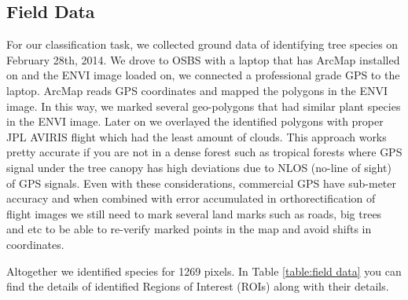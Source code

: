 \documentclass[remotesensing,article,accept,moreauthors,pdftex,12pt,a4paper]{mdpi}
\begin{document}
\subsection{Field Data}


For our classification task, we collected ground data of identifying tree species on February 28th, 2014. 
We drove to OSBS with a laptop that has ArcMap installed on and the ENVI image loaded on, we connected a professional grade GPS to the laptop. 
ArcMap reads GPS coordinates and mapped the polygons in the ENVI image. 
In this way, we marked several geo-polygons that had similar plant species in the ENVI image. 
Later on we overlayed the identified polygons with proper JPL AVIRIS flight which had the least amount of clouds. 
This approach works pretty accurate if you are not in a dense forest such as tropical forests where GPS signal under the tree canopy has high deviations due to NLOS (no-line of sight) of GPS signals. 
Even with these considerations, commercial GPS have sub-meter accuracy and when combined with error accumulated in orthorectification of flight images we still need to mark several land marks such as roads, big trees and etc to be able to re-verify marked points in the map and avoid shifts in coordinates.

Altogether we identified species for 1269 pixels. In Table \ref{table:field data} you can find the details of identified Regions of Interest (ROIs) along with their details. 
\end{document}
